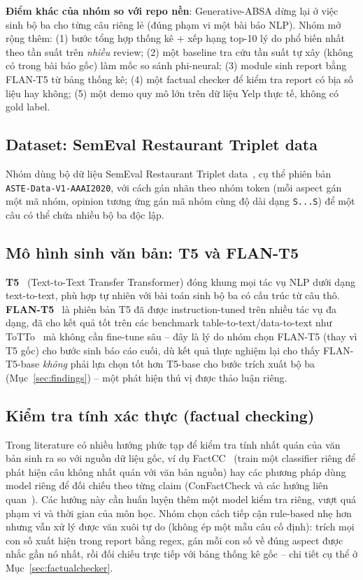 \documentclass[11pt,a4paper]{article}
\begin{document}
\textbf{Điểm khác của nhóm so với repo nền}: Generative-ABSA dừng lại ở việc
sinh bộ ba cho từng câu riêng lẻ (đúng phạm vi một bài báo NLP). Nhóm mở rộng
thêm: (1) bước tổng hợp thống kê + xếp hạng top-10 lý do phổ biến nhất theo
tần suất trên \emph{nhiều} review; (2) một baseline tra cứu tần suất tự xây
(không có trong bài báo gốc) làm mốc so sánh phi-neural; (3) module sinh
report bằng FLAN-T5 từ bảng thống kê; (4) một factual checker để kiểm tra
report có bịa số liệu hay không; (5) một demo quy mô lớn trên dữ liệu Yelp
thực tế, không có gold label.

\subsection{Dataset: SemEval Restaurant Triplet data}

Nhóm dùng bộ dữ liệu SemEval Restaurant Triplet
data~\cite{peng2020aste,xu2020aste}, cụ thể phiên bản
\texttt{ASTE-Data-V1-AAAI2020}, với cách gán nhãn theo nhóm token (mỗi
aspect gán một mã nhóm, opinion tương ứng gán mã nhóm cùng độ dài dạng
\texttt{S...S}) để một câu có thể chứa nhiều bộ ba độc lập.

\subsection{Mô hình sinh văn bản: T5 và FLAN-T5}

\textbf{T5}~\cite{t5} (Text-to-Text Transfer Transformer) đóng khung mọi
tác vụ NLP dưới dạng text-to-text, phù hợp tự nhiên với bài toán sinh bộ ba
có cấu trúc từ câu thô. \textbf{FLAN-T5}~\cite{flant5} là phiên bản T5 đã
được instruction-tuned trên nhiều tác vụ đa dạng, đã cho kết quả tốt trên
các benchmark table-to-text/data-to-text như ToTTo~\cite{t5totto} mà không
cần fine-tune sâu -- đây là lý do nhóm chọn FLAN-T5 (thay vì T5 gốc) cho
bước sinh báo cáo cuối, dù kết quả thực nghiệm lại cho thấy FLAN-T5-base
\emph{không} phải lựa chọn tốt hơn T5-base cho bước trích xuất bộ ba
(Mục~\ref{sec:findings}) -- một phát hiện thú vị được thảo luận riêng.

\subsection{Kiểm tra tính xác thực (factual checking)}

Trong literature có nhiều hướng phức tạp để kiểm tra tính nhất quán của văn
bản sinh ra so với nguồn dữ liệu gốc, ví dụ FactCC~\cite{factcc} (train một
classifier riêng để phát hiện câu không nhất quán với văn bản nguồn) hay các
phương pháp dùng model riêng để đối chiếu theo từng claim (ConFactCheck và
các hướng liên quan~\cite{consistency2024}). Các hướng này cần huấn luyện
thêm một model kiểm tra riêng, vượt quá phạm vi và thời gian của môn học.
Nhóm chọn cách tiếp cận rule-based nhẹ hơn nhưng vẫn xử lý được văn xuôi tự
do (không ép một mẫu câu cố định): trích mọi con số xuất hiện trong report
bằng regex, gán mỗi con số về đúng aspect được nhắc gần nó nhất, rồi đối
chiếu trực tiếp với bảng thống kê gốc -- chi tiết cụ thể ở
Mục~\ref{sec:factualchecker}.
\end{document}
